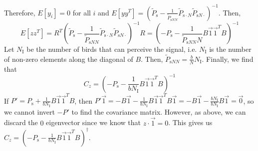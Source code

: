 \documentclass{article}
\begin{document}
Therefore, $E[y_i]=0$ for all $i$ and $E[yy^T]=(\tilde{P}_{\text{s}}-\frac{1}{\tilde{P}_{\text{s}NN}}\tilde{P}_{\text{s}\cdot N}\tilde{P}_{\text{s}N\cdot })^{-1}$. Then, 
\begin{equation*}
E[zz^T]=R^T\left(\tilde{P}_{\text{s}}-\frac{1}{\tilde{P}_{\text{s}NN}}\tilde{P}_{\text{s}\cdot N}\tilde{P}_{\text{s}N\cdot }\right)^{-1}R=\left(-P_\text{s}-\frac{1}{\tilde{P}_{\text{s}NN}N}B\vec{1}\vec{1}^TB\right)^{-1}
\end{equation*}
Let $N_\text{I}$ be the number of birds that can perceive the signal, i.e. $N_\text{I}$ is the number of non-zero elements along the diagonal of $B$. Then, $\tilde{P}_{\text{s}NN}=\frac{b}{N}N_\text{I}$. 
Finally, we find that 
\begin{equation}
C_z=\left(-P_\text{s}-\frac{1}{bN_\text{I}}B\vec{1}\vec{1}^TB\right)^{-1}
\end{equation}
If $P'=P_\text{s}+\frac{1}{bN_\text{I}}B\vec{1}\vec{1}^TB$, then $P'\vec{1}=-B\vec{1}-\frac{1}{bN_\text{I}}B\vec{1}\vec{1}^TB\vec{1}=-B\vec{1}-\frac{bN_\text{I}}{bN_\text{I}}B\vec{1}=\vec{0}$, so we cannot invert $-P'$ to find the covariance matrix. However, as above, we can discard the $0$ eigenvector since we know that $z\cdot \vec{1}=0$. This gives us $C_z=(-P_\text{s}-\frac{1}{bN_\text{I}}B\vec{1}\vec{1}^TB)^{\dagger}$.
\end{document}
